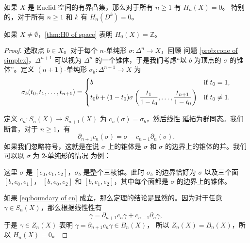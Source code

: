\documentclass[fontset=none]{Notes}
\begin{document}
\begin{theorem}
  如果 $X$ 是 Euclid 空间的有界凸集，那么对于所有 $n\geq 1$ 有 $H_n(X)=0$。
  特别的，对于所有 $n\geq 1$ 和 $k$ 有 $H_n(D^k)=0$。
\end{theorem}
\begin{remark}
  如果 $X\neq\emptyset$，\autoref{thm:H0 of space} 表明 $H_0(X)=\mathbb{Z}$。
\end{remark}
\begin{proof}
  选取点 $b\in X$。对于每个 $n$-单纯形 $\sigma:\Delta^n\to X$，回顾
  问题 \ref{prob:cone of simplex}，$\Delta^{n+1}$ 可以视为 $\Delta^n$
  的一个锥体，于是我们考虑“以 $b$ 为顶点的 $\sigma$ 的锥体”。定义
  $(n+1)$-单纯形 $\sigma_b:\Delta^{n+1}\to X$ 为
  \[
    \sigma_b(t_0,t_1,\dots,t_{n+1})=\begin{dcases}
      b & \text{if $t_0=1$},\\
      t_0b+(1-t_0)\sigma\left(
        \frac{t_1}{1-t_0},\dots,\frac{t_{n+1}}{1-t_0}
      \right) & \text{if $t_0\neq 1$}.
    \end{dcases}
  \]

  定义 $c_n:S_n(X)\to S_{n+1}(X)$ 为 $c_n(\sigma)=\sigma_b$，然后线性
  延拓为群同态。我们断言，对于 $n\geq 1$，有
  \begin{equation}\label{eq:boundary of cn}
    \partial_{n+1}c_n(\sigma)=\sigma-c_{n-1}\partial_n(\sigma).
  \end{equation}  
  如果我们忽略符号，这就是在说 $\sigma$ 上的锥体是 $\sigma$ 和
  $\sigma$ 的边界上的锥体的并。我们可以以 $\sigma$ 为 $2$-单纯形的情况
  为例：
  \begin{center}
  \end{center}
  这里 $\sigma$ 是 $[e_0,e_1,e_2]$，$\sigma_b$ 是整个三棱锥。此时
  $\sigma_b$ 的边界恰好为 $\sigma$ 以及三个面 $[b,e_0,e_1]$，
  $[b,e_0,e_2]$ 和 $[b,e_1,e_2]$，其中每个面都是 $\sigma$ 的边界上的锥体。

  如果 \eqref{eq:boundary of cn} 成立，那么定理的结论是显然的。因为对于任意
  $\gamma\in S_n(X)$，那么根据线性性有
  \[
    \gamma=\partial_{n+1}c_n\gamma+c_{n-1}\partial_n\gamma,
  \]
  于是 $\gamma\in Z_n(X)$ 表明 $\gamma=\partial_{n+1}c_n\gamma\in B_n(X)$，
  所以 $Z_n(X)=B_n(X)$，所以 $H_n(X)=0$。


\end{proof}
\end{document}

